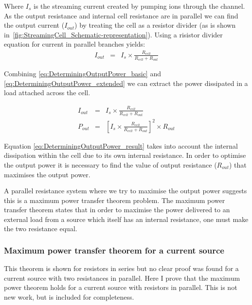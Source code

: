 Where $I_{s}$ is the streaming current created by pumping ions through the channel.
As the output resistance and internal cell resistance are in parallel we can find the output current ($I_{out}$) by treating the cell as a resistor divider (as is shown in~\cref{fig:StreamingCell_Schematic-representation}).
Using a risistor divider equation for current in parallel branches yields:
\begin{eqnarray}
    I_{out} & = & I_{s}\times\frac{R_{cell}}{R_{cell}+R_{out}}
    \label{eq:DeterminingOutputPower_extended}
\end{eqnarray}

Combining \eqref{eq:DeterminingOutputPower_basic} and \eqref{eq:DeterminingOutputPower_extended} we can extract the power dissipated in a load attached across the cell.

\begin{eqnarray}
    I_{out} & = & I_{s}\times\frac{R_{cell}}{R_{cell}+R_{out}}\nonumber \\
    P_{out} & = & \left[I_{s}\times\frac{R_{cell}}{R_{cell}+R_{out}}\right]^{2}\times R_{out}
    \label{eq:DeterminingOutputPower_result}
\end{eqnarray}

Equation \eqref{eq:DeterminingOutputPower_result} takes into account the internal dissipation within the cell due to its own internal resistance.
In order to optimise the output power it is necessary to find the value of output resistance ($R_{out}$) that maximises the output power.

A parallel resistance system where we try to maximise the output power suggests this is a maximum power transfer theorem problem.
The maximum power transfer theorem states that in order to maximise the power delivered to an external load from a source which itself has an internal resistance, one must make the two resistance equal.

\subsubsection*{Maximum power transfer theorem for a current source}
This theorem is shown for resistors in series but no clear proof was found for a current source with two resistances in parallel.
Here I prove that the maximum power theorem holds for a current source with resistors in parallel.
This is not new work, but is included for completeness.

